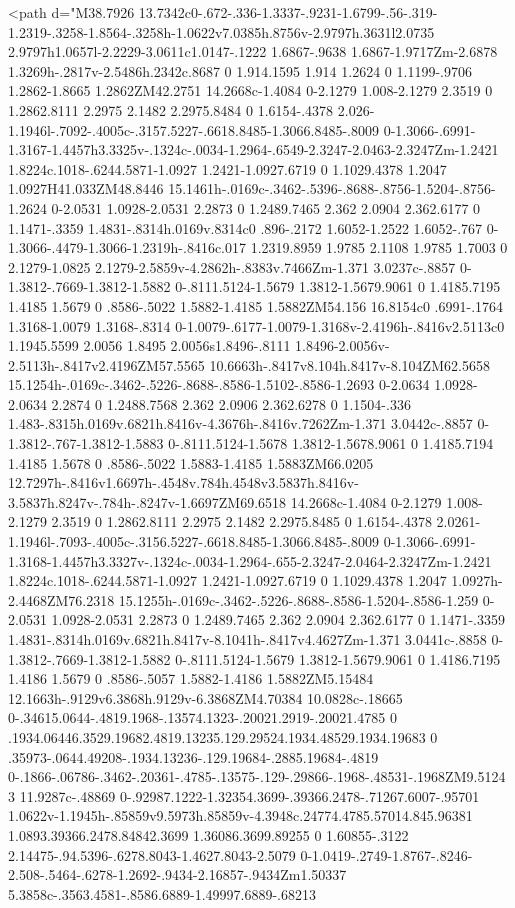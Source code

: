 {{{<path d="M38.7926 13.7342c0-.672-.336-1.3337-.9231-1.6799-.56-.319-1.2319-.3258-1.8564-.3258h-1.0622v7.0385h.8756v-2.9797h.3631l2.0735 2.9797h1.0657l-2.2229-3.0611c1.0147-.1222 1.6867-.9638 1.6867-1.9717Zm-2.6878 1.3269h-.2817v-2.5486h.2342c.8687 0 1.914.1595 1.914 1.2624 0 1.1199-.9706 1.2862-1.8665 1.2862ZM42.2751 14.2668c-1.4084 0-2.1279 1.008-2.1279 2.3519 0 1.2862.8111 2.2975 2.1482 2.2975.8484 0 1.6154-.4378 2.026-1.1946l-.7092-.4005c-.3157.5227-.6618.8485-1.3066.8485-.8009 0-1.3066-.6991-1.3167-1.4457h3.3325v-.1324c-.0034-1.2964-.6549-2.3247-2.0463-2.3247Zm-1.2421 1.8224c.1018-.6244.5871-1.0927 1.2421-1.0927.6719 0 1.1029.4378 1.2047 1.0927H41.033ZM48.8446 15.1461h-.0169c-.3462-.5396-.8688-.8756-1.5204-.8756-1.2624 0-2.0531 1.0928-2.0531 2.2873 0 1.2489.7465 2.362 2.0904 2.362.6177 0 1.1471-.3359 1.4831-.8314h.0169v.8314c0 .896-.2172 1.6052-1.2522 1.6052-.767 0-1.3066-.4479-1.3066-1.2319h-.8416c.017 1.2319.8959 1.9785 2.1108 1.9785 1.7003 0 2.1279-1.0825 2.1279-2.5859v-4.2862h-.8383v.7466Zm-1.371 3.0237c-.8857 0-1.3812-.7669-1.3812-1.5882 0-.8111.5124-1.5679 1.3812-1.5679.9061 0 1.4185.7195 1.4185 1.5679 0 .8586-.5022 1.5882-1.4185 1.5882ZM54.156 16.8154c0 .6991-.1764 1.3168-1.0079 1.3168-.8314 0-1.0079-.6177-1.0079-1.3168v-2.4196h-.8416v2.5113c0 1.1945.5599 2.0056 1.8495 2.0056s1.8496-.8111 1.8496-2.0056v-2.5113h-.8417v2.4196ZM57.5565 10.6663h-.8417v8.104h.8417v-8.104ZM62.5658 15.1254h-.0169c-.3462-.5226-.8688-.8586-1.5102-.8586-1.2693 0-2.0634 1.0928-2.0634 2.2874 0 1.2488.7568 2.362 2.0906 2.362.6278 0 1.1504-.336 1.483-.8315h.0169v.6821h.8416v-4.3676h-.8416v.7262Zm-1.371 3.0442c-.8857 0-1.3812-.767-1.3812-1.5883 0-.8111.5124-1.5678 1.3812-1.5678.9061 0 1.4185.7194 1.4185 1.5678 0 .8586-.5022 1.5883-1.4185 1.5883ZM66.0205 12.7297h-.8416v1.6697h-.4548v.784h.4548v3.5837h.8416v-3.5837h.8247v-.784h-.8247v-1.6697ZM69.6518 14.2668c-1.4084 0-2.1279 1.008-2.1279 2.3519 0 1.2862.8111 2.2975 2.1482 2.2975.8485 0 1.6154-.4378 2.0261-1.1946l-.7093-.4005c-.3156.5227-.6618.8485-1.3066.8485-.8009 0-1.3066-.6991-1.3168-1.4457h3.3327v-.1324c-.0034-1.2964-.655-2.3247-2.0464-2.3247Zm-1.2421 1.8224c.1018-.6244.5871-1.0927 1.2421-1.0927.6719 0 1.1029.4378 1.2047 1.0927h-2.4468ZM76.2318 15.1255h-.0169c-.3462-.5226-.8688-.8586-1.5204-.8586-1.259 0-2.0531 1.0928-2.0531 2.2873 0 1.2489.7465 2.362 2.0904 2.362.6177 0 1.1471-.3359 1.4831-.8314h.0169v.6821h.8417v-8.1041h-.8417v4.4627Zm-1.371 3.0441c-.8858 0-1.3812-.7669-1.3812-1.5882 0-.8111.5124-1.5679 1.3812-1.5679.9061 0 1.4186.7195 1.4186 1.5679 0 .8586-.5057 1.5882-1.4186 1.5882ZM5.15484 12.1663h-.9129v6.3868h.9129v-6.3868ZM4.70384 10.0828c-.18665 0-.34615.0644-.4819.1968-.13574.1323-.20021.2919-.20021.4785 0 .1934.06446.3529.19682.4819.13235.129.29524.1934.48529.1934.19683 0 .35973-.0644.49208-.1934.13236-.129.19684-.2885.19684-.4819 0-.1866-.06786-.3462-.20361-.4785-.13575-.129-.29866-.1968-.48531-.1968ZM9.51243 11.9287c-.48869 0-.92987.1222-1.32354.3699-.39366.2478-.71267.6007-.95701 1.0622v-1.1945h-.85859v9.5973h.85859v-4.3948c.24774.4785.57014.845.96381 1.0893.39366.2478.84842.3699 1.36086.3699.89255 0 1.60855-.3122 2.14475-.94.5396-.6278.8043-1.4627.8043-2.5079 0-1.0419-.2749-1.8767-.8246-2.508-.5464-.6278-1.2692-.9434-2.16857-.9434Zm1.50337 5.3858c-.3563.4581-.8586.6889-1.49997.6889-.68213 }}}
